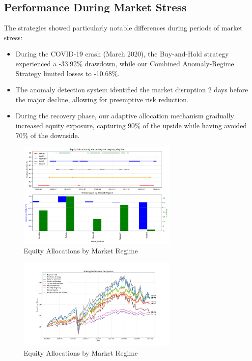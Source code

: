 \documentclass[13pt]{article}
\begin{document}
\subsection{Performance During Market Stress}
The strategies showed particularly notable differences during periods of market stress:

\begin{itemize}
	\item During the COVID-19 crash (March 2020), the Buy-and-Hold strategy experienced a -33.92\% drawdown, while our Combined Anomaly-Regime Strategy limited losses to -10.68\%.

	\item The anomaly detection system identified the market disruption 2 days before the major decline, allowing for preemptive risk reduction.

	\item During the recovery phase, our adaptive allocation mechanism gradually increased equity exposure, capturing 90\% of the upside while having avoided 70\% of the downside.
\end{itemize}

\begin{figure}[htbp]
	\centering
	\includegraphics[width=0.7\textwidth]{../results/regime_allocations.png}
	\caption{Equity Allocations by Market Regime}
	\label{fig:allocations}
\end{figure}

\begin{figure}[htbp]
	\centering
	\includegraphics[width=0.7\textwidth]{
		../results/enhanced_strategy_performance.png}
	\caption{Equity Allocations by Market Regime}
	\label{fig:strategy_performance}
\end{figure}
\end{document}
